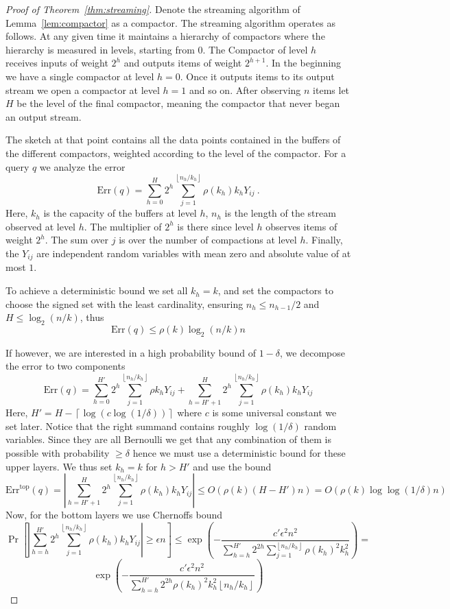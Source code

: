 \documentclass{article} %
\newcommand{\eps}{\epsilon}
\newcommand{\floor}[1]{\left \lfloor #1 \right \rfloor}
\newcommand{\ceil}[1]{\left \lceil #1 \right \rceil}
\begin{document}
\begin{proof} [Proof of Theorem~\ref{thm:streaming}]
Denote the streaming algorithm of Lemma~\ref{lem:compactor} as a compactor. The streaming algorithm operates as follows. At any given time it maintains a hierarchy of compactors where the hierarchy is measured in levels, starting from 0. The Compactor of level $h$ receives inputs of weight $2^h$ and outputs items of weight $2^{h+1}$. In the beginning we have a single compactor at level $h=0$. Once it outputs items to its output stream we open a compactor at level $h=1$ and so on. After observing $n$ items let $H$ be the level of the final compactor, meaning the compactor that never began an output stream.

The sketch at that point contains all the data points contained in the buffers of the different compactors, weighted according to the level of the compactor. For a query $q$ we analyze the error
$$\text{Err}(q) = \sum_{h=0}^H 2^h \sum_{j=1}^{\floor{n_h/k_h} } \rho(k_h) k_h Y_{ij} \ .$$
Here, $k_h$ is the capacity of the buffers at level $h$, $n_h$ is the length of the stream observed at level $h$. The multiplier of $2^h$ is there since level $h$ observes items of weight $2^h$. The sum over $j$ is over the number of compactions at level $h$. Finally, the $Y_{ij}$ are independent random variables with mean zero and absolute value of at most $1$. 

To achieve a deterministic bound we set all $k_h=k$, and set the compactors to choose the signed set with the least cardinality, ensuring $n_h \leq n_{h-1}/2$ and $H \leq \log_2(n/k)$, thus
$$ \text{Err}(q) \leq \rho(k) \log_2(n/k) n $$

If however, we are interested in a high probability bound of $1-\delta$, we decompose the error to two components
$$\text{Err}(q) = \sum_{h=0}^{H'} 2^h \sum_{j=1}^{\floor{n_h/k_h} } \rho k_h Y_{ij} + \sum_{h=H'+1}^H 2^h \sum_{j=1}^{\floor{n_h/k_h} } \rho(k_h) k_h Y_{ij}$$
 Here, $H' = H - \ceil{\log(c \log(1/ \delta))}$ where $c$ is some universal constant we set later. Notice that the right summand contains roughly $\log(1/\delta)$ random variables. Since they are all Bernoulli we get that any combination of them is possible with probability $\geq \delta$ hence we must use a deterministic bound for these upper layers. We thus set $k_h=k$ for $h > H'$ and use the bound
$$ \text{Err}^{\text{top}}(q) = \left|\sum_{h=H'+1}^H 2^h \sum_{j=1}^{\floor{n_h/k_h} } \rho(k_h) k_h Y_{ij}\right| \leq O\left( \rho(k) \left(H-H'\right) n \right) =  O\left( \rho(k) \log \log(1/ \delta) n \right) $$
Now, for the bottom layers we use Chernoffs bound
$$ \Pr\left[   \left|\sum_{h=h}^{H'} 2^h \sum_{j=1}^{\floor{n_h/k_h} } \rho(k_h) k_h Y_{ij} \right| \geq \eps n \right] \leq \exp \left( -\frac{c' \eps^2 n^2}{\sum_{h=h}^{H'} 2^{2h} \sum_{j=1}^{\floor{n_h/k_h} } \rho(k_h)^2 k_h^2}   \right) =$$
$$\exp \left( -\frac{c' \eps^2 n^2}{\sum_{h=h}^{H'} 2^{2h} \rho(k_h)^2 k_h^2 \floor{n_h/k_h} } \right) $$


\end{proof}
\end{document}
